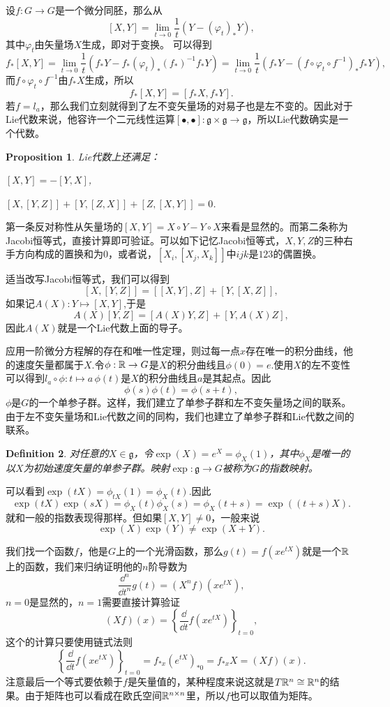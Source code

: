\documentclass[9pt]{extbook}
\theoremstyle{plain}
\newtheorem{defi}{Definition}
\newtheorem{pro}[defi]{Proposition}
\newcommand{\lag}{{\mathfrak{g}}}  %
\begin{document}
设$f:G\to G$是一个微分同胚，那么从
\[
	[X,Y]=\lim_{t\to 0}\frac{1}{t}\left(Y-(\varphi_t)_*Y\right),
\]
其中$\varphi_t$由矢量场$X$生成，即对于变换。
可以得到
\[
	f_*[X,Y]=\lim_{t\to 0}\frac{1}{t}\left(f_*Y-f_*(\varphi_t)_*(f_*)^{-1}f_*Y\right)=\lim_{t\to 0}\frac{1}{t}\left(f_*Y-(f\circ\varphi_t\circ f^{-1})_*f_*Y\right),
\]
而$f\circ\varphi_t\circ f^{-1}$由$f_*X$生成，所以
\[
	f_*[X,Y]=[f_*X,f_*Y].
\]
若$f=l_a$，那么我们立刻就得到了左不变矢量场的对易子也是左不变的。因此对于Lie代数来说，他容许一个二元线性运算$[\bullet,\bullet]:\lag\times \lag\to \lag$，所以Lie代数确实是一个代数。
\begin{pro}
Lie代数上还满足：

 $[X,Y]=-[Y,X]$,

 $[X,[Y,Z]]+[Y,[Z,X]]+[Z,[X,Y]]=0$.
\end{pro}
第一条反对称性从矢量场的$[X,Y]=X\circ Y-Y\circ X$来看是显然的。而第二条称为Jacobi恒等式，直接计算即可验证。可以如下记忆Jacobi恒等式，$X,Y,Z$的三种右手方向构成的置换和为$0$，或者说，$[X_i,[X_j,X_k]]$中$ijk$是$123$的偶置换。

适当改写Jacobi恒等式，我们可以得到
\[
[X,[Y,Z]]=[[X,Y],Z]+[Y,[X,Z]],
\]
如果记$A(X):Y\mapsto [X,Y]$,于是
\[
A(X)[Y,Z]=[A(X)Y,Z]+[Y,A(X)Z],
\]
因此$A(X)$就是一个Lie代数上面的导子。

应用一阶微分方程解的存在和唯一性定理，则过每一点$x$存在唯一的积分曲线，他的速度矢量都属于$X$.令$\phi:\mathbb{R}\to G$是$X$的积分曲线且$\phi(0)=e$.使用$X$的左不变性可以得到$l_a\circ \phi:t\mapsto a\,\phi(t)$是$X$的积分曲线且$a$是其起点。因此
\[
\phi(s)\phi(t)=\phi(s+t),
\]
$\phi$是$G$的一个单参子群。这样，我们建立了单参子群和左不变矢量场之间的联系。由于左不变矢量场和Lie代数之间的同构，我们也建立了单参子群和Lie代数之间的联系。

\begin{defi}
对任意的$X\in \lag$，令$\exp(X)=e^X=\phi_X(1)$，其中$\phi_X$是唯一的以$X$为初始速度矢量的单参子群。映射$\exp:\lag\to G$被称为$G$的指数映射。
\end{defi}
可以看到$\exp(tX)=\phi_{tX}(1)=\phi_{X}(t)$.因此
\[
\exp(tX)\exp(sX)=\phi_{X}(t)\phi_{X}(s)=\phi_{X}(t+s)=\exp((t+s)X).
\]
就和一般的指数表现得那样。但如果$[X,Y]\neq 0$，一般来说\[
\exp(X)\exp(Y)\neq \exp(X+Y).
\]

我们找一个函数$f$，他是$G$上的一个光滑函数，那么$g(t)=f(xe^{tX})$就是一个$\mathbb{R}$上的函数，我们来归纳证明他的$n$阶导数为
\[
	\frac{\dd^n}{\dd t^n}g(t)=(X^nf)(x e^{tX}),
\]
$n=0$是显然的，$n=1$需要直接计算验证
\[
	(Xf)(x)=\left\{\frac{\dd}{\dd t}f(x e^{tX})\right\}_{t=0},
\]
这个的计算只要使用链式法则
\[
	\left\{\frac{\dd}{\dd t}f(x e^{tX})\right\}_{t=0}=f_{*x}(e^{tX})_{*0}=f_{*x}X=(Xf)(x).
\]
注意最后一个等式要依赖于$f$是矢量值的，某种程度来说这就是$T\mathbb{R}^n\cong \mathbb{R}^n$的结果。由于矩阵也可以看成在欧氏空间$\mathbb{R}^{n\times n}$里，所以$f$也可以取值为矩阵。
\end{document}
